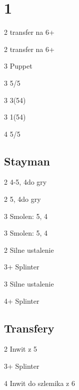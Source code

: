 \documentclass[12pt, a4paper]{article}
\begin{document}
\pagebreak
\section*{1\ntx}
\begin{options}[2]
    \item[2\spades] transfer na 6+\clubs \orr \inv \bal
    \item[2\nt] transfer na 6+\diams
    \item[3\clubs] Puppet
    \item[3\diams] 5/5 \twosuit{\clubs}{\diams}
    \item[3\hearts] 3\hearts(54)    
    \item[3\spades] 1\hearts(54) 
    \item[4\clubs] 5/5 \twosuit{\hearts}{\spades} 
\end{options}

\subsection*{Stayman}
\begin{options}[2]
    \item[2\hearts] 4-5\hearts, 4\spades do gry
    \item[2\spades] 5\spades, 4\hearts do gry
    \item[3\hearts] Smolen: 5\spades, 4\hearts \gf
    \item[3\spades] Smolen: 5\hearts, 4\spades \gf 
\end{options}

\begin{options}[2]
    \item[2\spades] Silne ustalenie \hearts \imp
    \item[3\spades+] Splinter 
\end{options}

\begin{options}[2]
    \item[3\hearts] Silne ustalenie \spades \imp
    \item[4\clubs+] Splinter 
\end{options}


\subsection*{Transfery}
\begin{options}[2]
    \item[2\spades] Inwit z 5\spades
    \item[3\spades+] Splinter 
    \item[4\hearts] Inwit do szlemika z 6  
\end{options}
\end{document}
